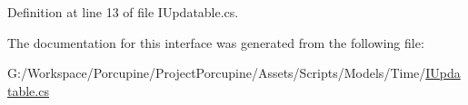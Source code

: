 Definition at line 13 of file I\+Updatable.\+cs.



The documentation for this interface was generated from the following file\+:\begin{DoxyCompactItemize}
\item 
G\+:/\+Workspace/\+Porcupine/\+Project\+Porcupine/\+Assets/\+Scripts/\+Models/\+Time/\hyperlink{_i_updatable_8cs}{I\+Updatable.\+cs}\end{DoxyCompactItemize}
